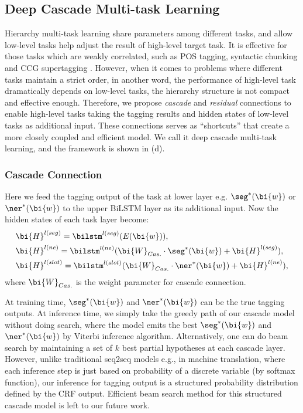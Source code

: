 \subsection{Deep Cascade Multi-task Learning}
\label{sec:dcmtl}
Hierarchy multi-task learning share parameters among different tasks,
and allow low-level tasks help adjust the result of high-level target task.
It is effective for those tasks which are weakly correlated,
such as POS tagging, syntactic chunking and CCG supertagging \cite{sogaard2016deep}.
However, when it comes to problems where different tasks maintain a 
strict order, in another word, the performance of high-level task 
dramatically depends on low-level tasks,
the hierarchy structure is not compact and effective enough.
Therefore, we propose \emph{cascade} and \emph{residual} connections
to enable high-level tasks taking the tagging results and hidden states 
of low-level tasks as additional input. 
These connections serves as ``shortcuts'' that 
create a more closely coupled and efficient model.
We call it deep cascade multi-task learning, 
and the framework is shown in (d).

\subsubsection{Cascade Connection}
Here we feed the tagging output of the task at lower layer 
e.g. $\seg^*(\bi{w})$ or $\ner^*(\bi{w})$
to the upper BiLSTM layer as its additional input.
Now the hidden states of each task layer become:
\begin{eqnarray*}
	& \bi{H}^{l(seg)}=\bilstm^{l(seg)}(E(\bi{w})), \\
	& \bi{H}^{l(ne)}=\bilstm^{l(ne)}(\bi{W}_{Cas.}\cdot \seg^*(\bi{w})+\bi{H}^{l(seg)}), \\
	& \bi{H}^{l(slot)}=\bilstm^{l(slot)}(\bi{W}_{Cas.}\cdot 
	\ner^*(\bi{w})+\bi{H}^{l(ne)}),
\end{eqnarray*}
where $\bi{W}_{Cas.}$ is the weight parameter for cascade connection.

At training time, $\seg^*(\bi{w})$ and $\ner^*(\bi{w})$ can be the 
true tagging outputs.
At inference time, we simply take the greedy path of our cascade model 
without doing search, where the model emits the
best $\seg^*(\bi{w})$ and $\ner^*(\bi{w})$ by Viterbi inference algorithm.
Alternatively, one can do beam search \cite{sutskever2014sequence,vinyals2015show} by maintaining a set of $k$ best partial hypotheses at each cascade layer.
However, unlike traditional seq2seq models e.g., in machine translation,
where each inference step is just based on probability of a discrete variable 
(by softmax function), our inference for tagging output is a 
structured probability distribution defined by the CRF output.
Efficient beam search method for this structured cascade model is 
left to our future work.

